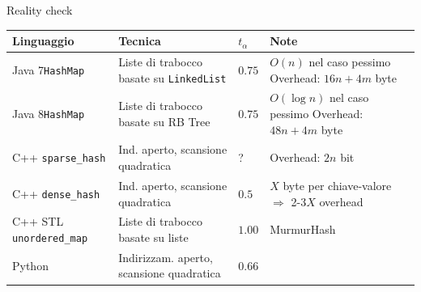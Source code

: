 \begin{frame}[shrink=10]{Reality check}

{\renewcommand*{\arraystretch}{1.4}
\begin{tabular}{|P{2.5cm}|P{4.0cm}|P{0.6cm}|P{4.3cm}|}
\hline
\textbf{Linguaggio} & \textbf{Tecnica} & $t_\alpha$ & \textbf{Note} 
\\ \hline
%
Java 7\newline \texttt{HashMap} &
Liste di trabocco basate su \texttt{LinkedList} &
$0.75$ &
$O(n)$ nel caso pessimo \newline
Overhead: $16n + 4m$ byte
\\ \hline
%
Java 8\newline \texttt{HashMap} &
Liste di trabocco basate su RB Tree &
$0.75$ &
$O(\log n)$ nel caso pessimo \newline
Overhead: $48n + 4m$ byte
\\ \hline
C++ \newline \texttt{sparse\_hash} &
Ind. aperto, scansione quadratica & 
? &
Overhead: $2n$ bit
\\ \hline
C++ \newline \texttt{dense\_hash} &
Ind. aperto, scansione quadratica & 
$0.5$ &
$X$ byte per chiave-valore $\Rightarrow$ 2-3$X$ overhead
\\ \hline
C++ STL \newline \texttt{unordered\_map} &
Liste di trabocco basate su liste &
$1.00$ &
MurmurHash
\\ \hline
Python &
Indirizzam. aperto, scansione quadratica &
$0.66$ &
\\ \hline
\end{tabular}
}
\end{frame}







